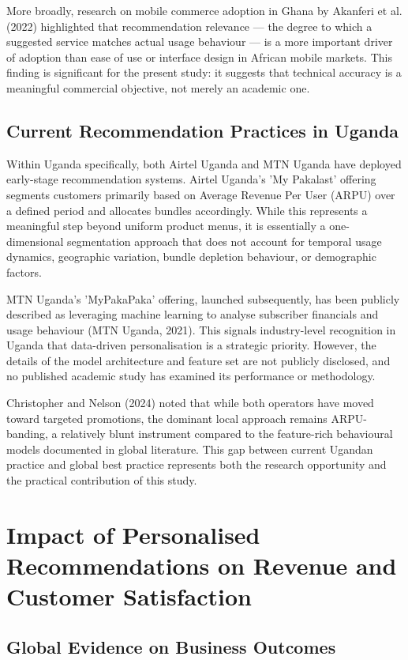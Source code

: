 More broadly, research on mobile commerce adoption in Ghana by Akanferi et al. (2022) highlighted that recommendation relevance --- the degree to which a suggested service matches actual usage behaviour --- is a more important driver of adoption than ease of use or interface design in African mobile markets. This finding is significant for the present study: it suggests that technical accuracy is a meaningful commercial objective, not merely an academic one.


\subsection{Current Recommendation Practices in Uganda}

Within Uganda specifically, both Airtel Uganda and MTN Uganda have deployed early-stage recommendation systems. Airtel Uganda's 'My Pakalast' offering segments customers primarily based on Average Revenue Per User (ARPU) over a defined period and allocates bundles accordingly. While this represents a meaningful step beyond uniform product menus, it is essentially a one-dimensional segmentation approach that does not account for temporal usage dynamics, geographic variation, bundle depletion behaviour, or demographic factors.

MTN Uganda's 'MyPakaPaka' offering, launched subsequently, has been publicly described as leveraging machine learning to analyse subscriber financials and usage behaviour (MTN Uganda, 2021). This signals industry-level recognition in Uganda that data-driven personalisation is a strategic priority. However, the details of the model architecture and feature set are not publicly disclosed, and no published academic study has examined its performance or methodology.

Christopher and Nelson (2024) noted that while both operators have moved toward targeted promotions, the dominant local approach remains ARPU-banding, a relatively blunt instrument compared to the feature-rich behavioural models documented in global literature. This gap between current Ugandan practice and global best practice represents both the research opportunity and the practical contribution of this study.


\section{Impact of Personalised Recommendations on Revenue and Customer Satisfaction}


\subsection{Global Evidence on Business Outcomes}

